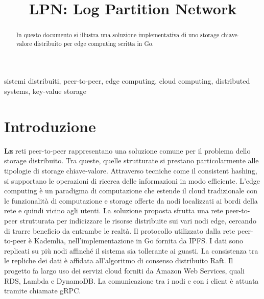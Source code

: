 \documentclass[conference]{IEEEtran}
\begin{document}
\title{LPN: Log Partition Network}

\author{
}


\maketitle

\begin{abstract}
In questo documento si illustra una soluzione implementativa di uno storage chiave-valore distribuito per edge computing scritta in Go.
\end{abstract}

\begin{IEEEkeywords}
sistemi distribuiti, peer-to-peer, edge computing, cloud computing, distributed systems, key-value storage
\end{IEEEkeywords}

\section{Introduzione}
\lettrine{\textbf{L}}{\textbf{e}} reti peer-to-peer rappresentano una soluzione comune per il problema dello storage distribuito.
Tra queste, quelle strutturate si prestano particolarmente alle tipologie di storage chiave-valore.
Attraverso tecniche come il consistent hashing, si supportano le operazioni di ricerca delle informazioni in modo efficiente.\cite{p2pLookup}
L'edge computing è un paradigma di computazione che estende il cloud tradizionale con le funzionalità di computazione e
storage offerte da nodi localizzati ai bordi della rete e quindi vicino agli utenti. La soluzione proposta sfrutta una
rete peer-to-peer strutturata per indicizzare le risorse distribuite sui vari nodi edge, cercando di trarre beneficio da entrambe le realtà.
Il protocollo utilizzato dalla rete peer-to-peer è Kademlia,\cite{kademlia} nell'implementazione in Go fornita da IPFS\cite{kadDHT}.
I dati sono replicati su più nodi affinché il sistema sia tollerante ai guasti.
La consistenza tra le repliche dei dati è affidata all'algoritmo di consenso distribuito Raft.\cite{raft}\cite{raftGolang}
Il progetto fa largo uso dei servizi cloud forniti da Amazon Web Services, quali RDS, Lambda e DynamoDB.
La comunicazione tra i nodi e con i client è attuata tramite chiamate gRPC.
\end{document}
